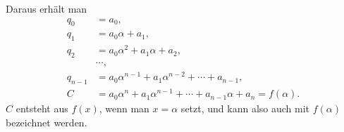 Daraus erhält man
\begin{equation}
\begin{aligned}
 q_0&=a_0,\\
 q_1&=a_0\alpha+a_1,\\
 q_2&=a_0\alpha^2+a_1\alpha+a_2,\\
 &\cdots,\\
 q_{n-1}&=a_0\alpha^{n-1}+a_1\alpha^{n-2}+\cdots+a_{n-1},\\
 C&=a_0\alpha^n+a_1\alpha^{n-1}+\cdots+a_{n-1}\alpha+a_n=f(\alpha).
\end{aligned}
\tag{6}
\end{equation}
$C$ entsteht aus $f(x)$, wenn man $x=\alpha$ setzt, und kann also auch
mit $f(\alpha)$ bezeichnet werden.
\endgroup
